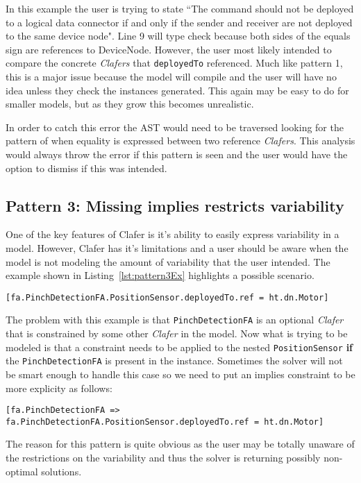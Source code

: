 \documentclass[10pt,oneside]{IEEEtran}
\begin{document}
In this example the user is trying to state ``The command should not be deployed to a logical data connector if and only if the sender and receiver are not deployed to the same device node". Line 9 will type check because both sides of the equals sign are references to DeviceNode. However, the user most likely intended to compare the concrete \textit{Clafers} that \lstinline$deployedTo$ referenced. Much like pattern 1, this is a major issue because the model will compile and the user will have no idea unless they check the instances generated. This again may be easy to do for smaller models, but as they grow this becomes unrealistic.

In order to catch this error the AST would need to be traversed looking for the pattern of when equality is expressed between two reference \textit{Clafers}. This analysis would always throw the error if this pattern is seen and the user would have the option to dismiss if this was intended.
\subsection{Pattern 3: Missing implies restricts variability}
One of the key features of Clafer is it's ability to easily express variability in a model. However, Clafer has it's limitations and a user should be aware when the model is not modeling the amount of variability that the user intended. The example shown in Listing~\ref{lst:pattern3Ex} highlights a possible scenario.
\begin{lstlisting}[label={lst:pattern3Ex},caption={Example of Pattern 3}]
[fa.PinchDetectionFA.PositionSensor.deployedTo.ref = ht.dn.Motor]
\end{lstlisting}

The problem with this example is that \lstinline$PinchDetectionFA$ is an optional \textit{Clafer} that is constrained by some other \textit{Clafer} in the model. Now what is trying to be modeled is that a constraint needs to be applied to the nested \lstinline$PositionSensor$ \textbf{if} the \lstinline$PinchDetectionFA$ is present in the instance. Sometimes the solver will not be smart enough to handle this case so we need to put an implies constraint to be more explicity as follows:
\begin{lstlisting}[]
[fa.PinchDetectionFA => fa.PinchDetectionFA.PositionSensor.deployedTo.ref = ht.dn.Motor]
\end{lstlisting}

The reason for this pattern is quite obvious as the user may be totally unaware of the restrictions on the variability and thus the solver is returning possibly non-optimal solutions.
\end{document}
